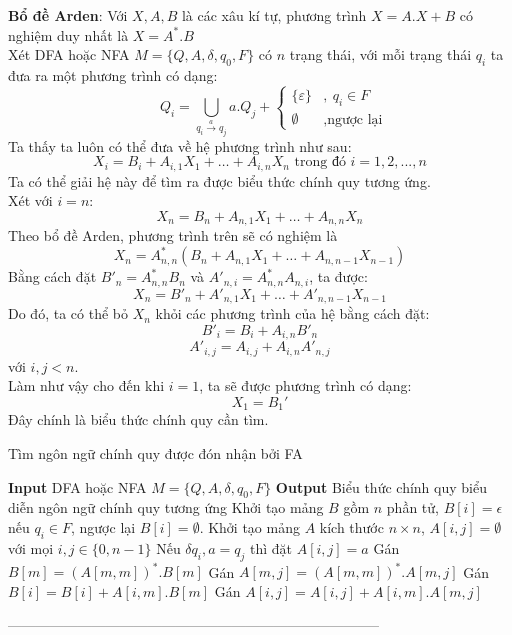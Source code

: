 \documentclass[14pt]{extreport}
\begin{document}
\textbf{Bổ đề Arden}: Với $X, A, B$ là các xâu kí tự, phương trình $X = A.X + B$ có nghiệm duy nhất là $X = A^*.B$\\
Xét DFA hoặc NFA $M = \{Q, A, \delta, q_0, F\}$ có $n$ trạng thái, với mỗi trạng thái $q_i$ ta đưa ra một phương trình có dạng:
\[\qquad \displaystyle Q_i = \bigcup\limits_{q_i \overset{a}{\to} q_j} a.Q_j + \begin{cases} \{\varepsilon\} &,\ q_i \in F \\ \emptyset &, \text{ngược lại}\end{cases}\]
Ta thấy ta luôn có thể đưa về hệ phương trình như sau:
\[X_i = B_i + A_{i,1}X_1 + … + A_{i,n}X_n \text{ trong đó } i = 1, 2, ..., n\]
Ta có thể giải hệ này để tìm ra được biểu thức chính quy tương ứng.\\
Xét với $i=n$:
\[X_n = B_n + A_{n,1}X_1 + … + A_{n,n}X_n\]
Theo bổ đề Arden, phương trình trên sẽ có nghiệm là 
\[X_n = A_{n,n}^* (B_n + A_{n,1}X_1 + … + A_{n,n-1}X_{n-1})\]
Bằng cách đặt $B'_n = A_{n,n}^* B_n$ và $A'_{n,i}=A_{n,n}^*A_{n,i}$, ta được:
\[X_n = B'_n + A'_{n,1}X_1 + … + A'_{n,n-1}X_{n-1}\]
Do đó, ta có thể bỏ $X_n$ khỏi các phương trình của hệ bằng cách đặt:
\[B'_i = B_i + A_{i,n}B'_n\]
\[A'_{i,j} = A_{i,j} + A_{i,n}A'_{n,j}\]
với $i, j < n$.\\
Làm như vậy cho đến khi $i=1$, ta sẽ được phương trình có dạng:
\[X_1 = B_1'\]
Đây chính là biểu thức chính quy cần tìm.
\begin{algorithm}[H]
\caption{Tìm ngôn ngữ chính quy được đón nhận bởi FA}
\begin{algorithmic} 
\STATE \textbf{Input} DFA hoặc NFA $M = \{Q, A, \delta, q_0, F\}$
\STATE \textbf{Output} Biểu thức chính quy biểu diễn ngôn ngữ chính quy tương ứng
\STATE Khởi tạo mảng $B$ gồm $n$ phần tử, $B[i] = \epsilon$ nếu $q_i \in F$, ngược lại $B[i] = \emptyset$.
\STATE Khởi tạo mảng $A$ kích thước $n \times n$, $A[i, j] = \emptyset$ với mọi $i, j \in \{0, n-1\}$
\STATE Nếu $\delta{q_i, a} = q_j$ thì đặt $A[i, j] = a$
\STATE Gán $B[m] = (A[m, m])^*.B[m]$
\STATE Gán $A[m, j] = (A[m, m])^*.A[m, j]$
\ENDFOR
{}
\STATE Gán $B[i] = B[i] + A[i, m].B[m]$
\STATE Gán $A[i, j] = A[i, j] + A[i, m].A[m, j]$
\ENDFOR
\ENDFOR
\ENDFOR
\end{algorithmic}
\end{algorithm}
--------------------------------------------------------------------------------\\
\end{document}
